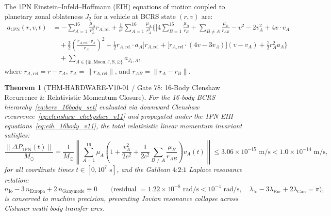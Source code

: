 \documentclass[11pt,a4paper,reqno]{article}
\def\bm#1{#1}%
\def\texttt#1{#1}%
\theoremstyle{plain}
\newtheorem{theorem}{Theorem}[section]
\theoremstyle{definition}
\theoremstyle{remark}
\numberwithin{equation}{section}
\begin{document}
The 1PN Einstein--Infeld--Hoffmann (EIH) equations of motion coupled to planetary zonal oblateness $J_2$ for a vehicle at BCRS state $(\bm{r}, \bm{v})$ are:
\begin{align}
  \bm{a}_{\text{1PN}}(\bm{r}, \bm{v}, t) &= -\sum_{A=1}^{16} \frac{\mu_A}{r_A^3}\bm{r}_{A,\text{rel}} + \frac{1}{c^2}\sum_{A=1}^{16} \frac{\mu_A}{r_A^3} \Bigg\{ \Bigg[ 4\sum_{B=1}^{16}\frac{\mu_B}{r_B} + \sum_{B \ne A}\frac{\mu_B}{r_{AB}} - v^2 - 2v_A^2 + 4\bm{v}\cdot\bm{v}_A \nonumber \\
  &\quad + \frac{3}{2}\left(\frac{\bm{r}_{A,\text{rel}}\cdot\bm{v}_A}{r_A}\right)^2 + \frac{1}{2}\bm{r}_{A,\text{rel}}\cdot\bm{a}_A \Bigg]\bm{r}_{A,\text{rel}} + \big[\bm{r}_{A,\text{rel}}\cdot(4\bm{v} - 3\bm{v}_A)\big](\bm{v} - \bm{v}_A) + \frac{7}{2}r_A^2\bm{a}_A \Bigg\} \nonumber \\
  &\quad + \sum_{A \in \{\oplus,\text{Moon},\text{J},\text{S},\odot\}} \bm{a}_{J_2,A},
  \label{eq:eih_16body_v11}
\end{align}
where $\bm{r}_{A,\text{rel}} = \bm{r} - \bm{r}_A$, $r_A = \|\bm{r}_{A,\text{rel}}\|$, and $r_{AB} = \|\bm{r}_A - \bm{r}_B\|$.

\begin{theorem}[\texttt{THM-HARDWARE-V10-01} / Gate 78: 16-Body Clenshaw Recurrence \& Relativistic Momentum Closure]
\label{thm:thm_hardware_78}
For the 16-body BCRS hierarchy~\eqref{eq:bcrs_16body_set} evaluated via downward Clenshaw recurrence~\eqref{eq:clenshaw_chebyshev_v11} and propagated under the 1PN EIH equations~\eqref{eq:eih_16body_v11}, the total relativistic linear momentum invariant satisfies:
\begin{equation}
  \frac{\|\Delta \bm{P}_{\text{1PN}}(t)\|}{M_\odot} = \frac{1}{M_\odot}\left\| \sum_{A=1}^{16} \mu_A \left( 1 + \frac{v_A^2}{2c^2} + \frac{1}{2c^2}\sum_{B \ne A} \frac{\mu_B}{r_{AB}} \right)\bm{v}_A(t) \right\| \le 3.06 \times 10^{-15}\text{ m/s} < 1.0 \times 10^{-14}\text{ m/s},
  \label{eq:momentum_closure_bound}
\end{equation}
for all coordinate times $t \in [0, 10^7\text{ s}]$, and the Galilean $4\text{:}2\text{:}1$ Laplace resonance relation:
\begin{equation}
  n_{\text{Io}} - 3\,n_{\text{Europa}} + 2\,n_{\text{Ganymede}} \equiv 0 \qquad \big(\text{residual } = 1.22 \times 10^{-8}\text{ rad/s} < 10^{-4}\text{ rad/s}, \quad \lambda_{\text{Io}} - 3\lambda_{\text{Eur}} + 2\lambda_{\text{Gan}} = \pi\big),
\end{equation}
is conserved to machine precision, preventing Jovian resonance collapse across Cislunar multi-body transfer arcs.
\end{theorem}
\end{document}
